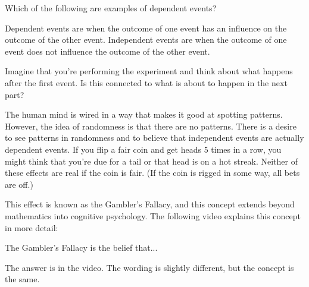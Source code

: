 \documentclass{ximera}
\begin{document}
\begin{question}
Which of the following are examples of dependent events?

    \begin{multipleChoice}
      \end{multipleChoice}
    \begin{hint}
    Dependent events are when the outcome of one event has an influence on the outcome of the other event. Independent events are when the outcome of one event does not influence the outcome of the other event.
    \end{hint}
    \begin{hint}
    Imagine that you're performing the experiment and think about what happens after the first event. Is this connected to what is about to happen in the next part?
    \end{hint}

\end{question}

The human mind is wired in a way that makes it good at spotting patterns. However, the idea of randomness is that there are no patterns. There is a desire to see patterns in randomness and to believe that independent events are actually dependent events. If you flip a fair coin and get heads 5 times in a row, you might think that you're due for a tail or that head is on a hot streak. Neither of these effects are real if the coin is fair. (If the coin is rigged in some way, all bets are off.)

This effect is known as the Gambler's Fallacy, and this concept extends beyond mathematics into cognitive psychology. The following video explains this concept in more detail: 



\begin{question}
The Gambler's Fallacy is the belief that...

    \begin{multipleChoice}
      \end{multipleChoice}
    \begin{hint}
    The answer is in the video. The wording is slightly different, but the concept is the same.
    \end{hint}

\end{question}
\end{document}
